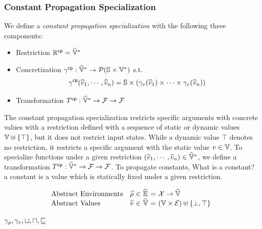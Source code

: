 \subsubsection{Constant Propagation Specialization}
We define a \textit{constant propagation specialization} with the following
three components:

\begin{itemize}
  \item Restriction $\mathbb{R}^{\textsf{cp}} = \widehat{\mathbb{V}}^*$
  \item Concretization $\gamma^{\textsf{cp}}: \widehat{\mathbb{V}}^* \rightarrow \mathcal{P}(\mathbb{S}
    \times \mathbb{V}^*)$ s.t.
    \[
      \gamma^{\textsf{cp}}(\widehat{v}_1, \cdots, \widehat{v}_n) =
      \mathbb{S} \times (\gamma_v(\widehat{v}_1) \times \cdots \times \gamma_v(\widehat{v}_n))
    \]
  \item Transformation $T^{\textsf{cp}}: \widehat{\mathbb{V}}^* \rightarrow \mathcal{F}
    \rightarrow \mathcal{F}$
\end{itemize}
The constant propagation specialization restricts specific arguments with
concrete values with a restriction defined with a sequence of static or dynamic
values $\mathbb{V} \uplus \{ \top \}$, but it does not restrict input states.
While a dynamic value $\top$ denotes no restriction, it restricts a specific
argument with the static value $v \in \mathbb{V}$. To specialize functions under
a given restriction $(\widehat{v}_1, \cdots, \widehat{v}_n) \in \widehat{\mathbb{V}}^*$, we
define a transformation $T^{\textsf{cp}}: \widehat{\mathbb{V}}^* \rightarrow \mathcal{F}
\rightarrow \mathcal{F}$. To propagate constants, \todo What is a constant?
a constant is a value which is statically fixed under a given restriction.

\[
  \begin{array}{lr@{~}c@{~}l@{~}c@{~}l}
    \text{Abstract Environments} & \aenv &\in& \aenvset &=&
    \varset \rightarrow \avalset\\
    \text{Abstract Values} & \aval &\in& \avalset &=&
    (\valset \times \exprset) \uplus \{ \bot, \top \}\\
  \end{array}
\]

\todo $\gamma_\rho, \gamma_v, \sqcup, \sqcap, \sqsubseteq$

